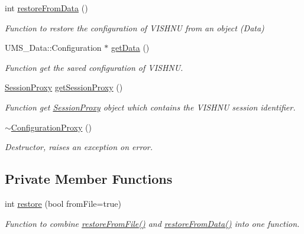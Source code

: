 \begin{DoxyCompactItemize}
int \hyperlink{classConfigurationProxy_a928c9e220845af6a169471f5d35aeb35}{restoreFromData} ()
\begin{DoxyCompactList}\small\item\em Function to restore the configuration of VISHNU from an object (Data) \item\end{DoxyCompactList}\item 
UMS\_\-Data::Configuration $\ast$ \hyperlink{classConfigurationProxy_a2f4b00c91144abd47d146835a44c4233}{getData} ()
\begin{DoxyCompactList}\small\item\em Function get the saved configuration of VISHNU. \item\end{DoxyCompactList}\item 
\hyperlink{classSessionProxy}{SessionProxy} \hyperlink{classConfigurationProxy_a4bf705d620244939cb8557a806b74daa}{getSessionProxy} ()
\begin{DoxyCompactList}\small\item\em Function get \hyperlink{classSessionProxy}{SessionProxy} object which contains the VISHNU session identifier. \item\end{DoxyCompactList}\item 
\hypertarget{classConfigurationProxy_a3e0aa7a462b6740c722e75caac0e2ff8}{
\hyperlink{classConfigurationProxy_a3e0aa7a462b6740c722e75caac0e2ff8}{$\sim$ConfigurationProxy} ()}
\label{classConfigurationProxy_a3e0aa7a462b6740c722e75caac0e2ff8}

\begin{DoxyCompactList}\small\item\em Destructor, raises an exception on error. \item\end{DoxyCompactList}\end{DoxyCompactItemize}
\subsection*{Private Member Functions}
\begin{DoxyCompactItemize}
\item 
int \hyperlink{classConfigurationProxy_a3c83af09aa3588da46c00ee5b05fb29b}{restore} (bool fromFile=true)
\begin{DoxyCompactList}\small\item\em Function to combine \hyperlink{classConfigurationProxy_a2f680f79eebe3969b5b5669908682ff0}{restoreFromFile()} and \hyperlink{classConfigurationProxy_a928c9e220845af6a169471f5d35aeb35}{restoreFromData()} into one function. \item\end{DoxyCompactList}\end{DoxyCompactItemize}
